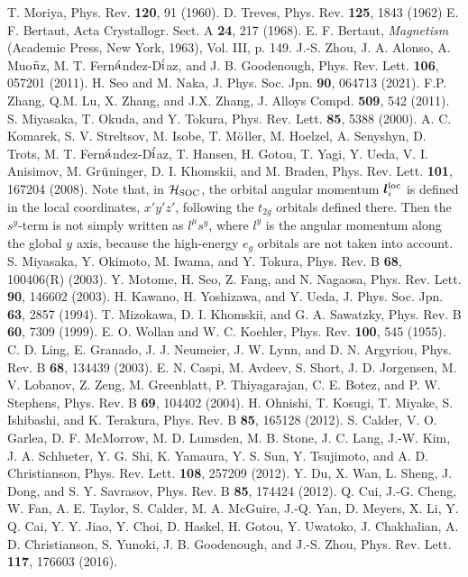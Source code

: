\documentclass[aps,twocolumn,prb,preprintnumbers,amsmath,amssymb]{revtex4-2}
\begin{document}
\begin{thebibliography}{99}
T. Moriya, Phys. Rev. {\bf 120}, 91 (1960).
%
D. Treves, 
Phys. Rev. {\bf 125}, 1843 (1962)
%
E. F. Bertaut, 
Acta Crystallogr. Sect. A {\bf 24}, 217 (1968).
%
E. F. Bertaut, {\it Magnetism} (Academic Press, New York, 1963), Vol. III, p. 149.
%
J.-S. Zhou, J. A. Alonso, A. Muo$\tilde{\rm n}$z, M. T. Fern$\acute{\rm a}$ndez-D$\acute{\rm i}$az, and J. B. Goodenough,
Phys. Rev. Lett. {\bf 106}, 057201 (2011).
%
H. Seo and M. Naka, 
J. Phys. Soc. Jpn. {\bf 90}, 064713 (2021).
%
F.P. Zhang, Q.M. Lu, X. Zhang, and J.X. Zhang, 
J. Alloys Compd. {\bf 509}, 542 (2011).
%
S. Miyasaka, T. Okuda, and Y. Tokura, 
Phys. Rev. Lett. {\bf 85}, 5388 (2000).
%
A. C. Komarek, S. V. Streltsov, M. Isobe, T. M$\ddot{\rm o}$ller, M. Hoelzel, A. Senyshyn, D. Trots, M. T. Fern$\acute{\rm a}$ndez-D$\acute{\rm i}$az, T. Hansen, H. Gotou, T. Yagi, Y. Ueda, V. I. Anisimov, M. Gr$\ddot{\rm u}$ninger, D. I. Khomskii, and M. Braden, 
Phys. Rev. Lett. {\bf 101}, 167204 (2008).
%
Note that, in ${\cal H}_{\rm SOC}$, the orbital angular momentum $ {\bm l}^{\rm loc}_i$ is defined in the local coordinates, $x'y'z'$, following the $t_{2g}$ orbitals defined there. 
Then the $s^y$-term is not simply written as $l^\mu s^y$, where $l^y$ is the angular momentum along the global $y$ axis, because the high-energy $e_g$ orbitals are not taken into account.
%
S. Miyasaka, Y. Okimoto, M. Iwama, and Y. Tokura, 
Phys. Rev. B {\bf 68}, 100406(R) (2003).
%
Y. Motome, H. Seo, Z. Fang, and N. Nagaosa,
Phys. Rev. Lett. {\bf 90}, 146602 (2003).
%
H. Kawano, H. Yoshizawa, and Y. Ueda, 
J. Phys. Soc. Jpn. {\bf 63}, 2857 (1994). 
%
T. Mizokawa, D. I. Khomskii, and G. A. Sawatzky, 
Phys. Rev. B {\bf 60}, 7309 (1999).
%
E. O. Wollan and W. C. Koehler, 
Phys. Rev. {\bf 100}, 545 (1955).
%
C. D. Ling, E. Granado, J. J. Neumeier, J. W. Lynn, and D. N. Argyriou, 
Phys. Rev. B {\bf 68}, 134439 (2003).
%
E. N. Caspi, M. Avdeev, S. Short, J. D. Jorgensen, M. V. Lobanov, Z. Zeng, M. Greenblatt, P. Thiyagarajan, C. E. Botez, and P. W. Stephens, 
Phys. Rev. B {\bf 69}, 104402 (2004).
%
H. Ohnishi, T. Kosugi, T. Miyake, S. Ishibashi, and K. Terakura, 
Phys. Rev. B {\bf 85}, 165128 (2012).
%
S. Calder, V. O. Garlea, D. F. McMorrow, M. D. Lumsden, M. B. Stone, J. C. Lang, J.-W. Kim, J. A. Schlueter, Y. G. Shi, K. Yamaura, Y. S. Sun, Y. Tsujimoto, and A. D. Christianson, 
Phys. Rev. Lett. {\bf 108}, 257209 (2012).
%
Y. Du, X. Wan, L. Sheng, J. Dong, and S. Y. Savrasov, 
Phys. Rev. B {\bf 85}, 174424 (2012).
%
Q. Cui, J.-G. Cheng, W. Fan, A. E. Taylor, S. Calder, M. A. McGuire, J.-Q. Yan, D. Meyers, X. Li, Y. Q. Cai, Y. Y. Jiao, Y. Choi, D. Haskel, H. Gotou, Y. Uwatoko, J. Chakhalian, A. D. Christianson, S. Yunoki, J. B. Goodenough, and J.-S. Zhou,
Phys. Rev. Lett. {\bf 117}, 176603 (2016).
\end{thebibliography}
\end{document}
